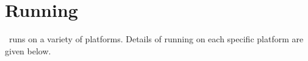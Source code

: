 
%
%
%
%
%
%
%
%
%
%
%
%
%
%
%
% 

\section{Running \NAMD}
\label{section:run}

\NAMD\ runs on a variety of platforms.  Details of running on each
specific platform are given below.

